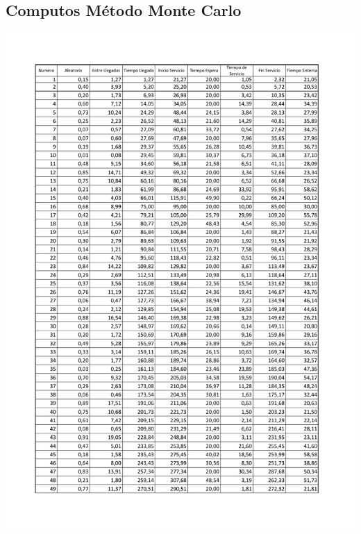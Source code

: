 \documentclass[10pt,letterpaper]{report}
\begin{document}
\subsection*{Computos Método Monte Carlo}
\begin{center}
\vspace{-2cm}
\includegraphics[page=1,scale=0.9]{Tabla2.pdf}
\end{center}
%
\end{document}
